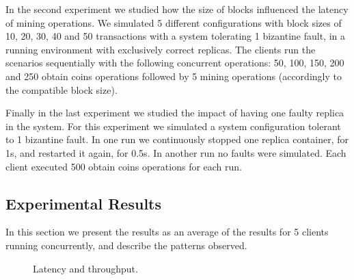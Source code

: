 \documentclass[10pt,journal,compsoc]{IEEEtran}
\begin{document}
	In the second experiment we studied how the size of blocks influenced the latency of mining operations. We simulated 5 different configurations with block sizes of 10, 20, 30, 40 and 50 transactions with a system tolerating 1 bizantine fault, in a running environment with exclusively correct replicas. The clients run the scenarios sequentially with the following concurrent operations: 50, 100, 150, 200 and 250 obtain coins operations followed by 5 mining operations (accordingly to the compatible block size).
	
	Finally in the last experiment we studied the impact of having one faulty replica in the system. For this experiment we simulated a system configuration tolerant to 1 bizantine fault. In one run we continuously stopped one replica container, for 1s, and restarted it again, for 0.5s. In another run no faults were simulated. Each client executed 500 obtain coins operations for each run.
	
	
	\subsection{Experimental Results}
	
	In this section we present the results as an average of the results for 5 clients running concurrently, and describe the patterns observed.
		
	\begin{figure}[!ht]
		\centering
		\vfil
		\centering
		\caption{Latency and throughput.}
	\end{figure}
	
\end{document}
